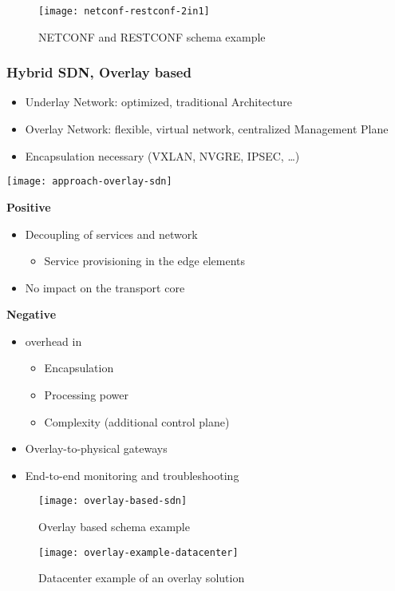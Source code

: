 \begin{figure}
	\centering
	\caption{NETCONF and RESTCONF schema example}
	\texttt{[image: netconf-restconf-2in1]}
\end{figure}

\subsubsection{Hybrid SDN, Overlay based}
\begin{itemize}
	\item Underlay Network: optimized, traditional Architecture 
	\item Overlay Network: flexible, virtual network, centralized Management Plane 
	\item Encapsulation necessary (VXLAN, NVGRE, IPSEC, \ldots) 
\end{itemize}

\texttt{[image: approach-overlay-sdn]}

\noindent
\textbf{Positive}
\begin{itemize}
	\item Decoupling of services and network 
		\begin{itemize}\item Service provisioning in the edge elements\end{itemize}
	\item No impact on the transport core  
\end{itemize}

\noindent
\textbf{Negative}
\begin{itemize}
	\item overhead in 
	\begin{itemize} \item Encapsulation \item Processing power \item Complexity (additional control plane) \end{itemize} 
	\item Overlay-to-physical gateways
	\item End-to-end monitoring and troubleshooting  
\end{itemize}

\begin{figure}
	\centering
	\caption{Overlay based schema example}
	\texttt{[image: overlay-based-sdn]}
\end{figure}

\begin{figure}
	\centering
	\texttt{[image: overlay-example-datacenter]}
	\caption{Datacenter example of an overlay solution}
\end{figure}